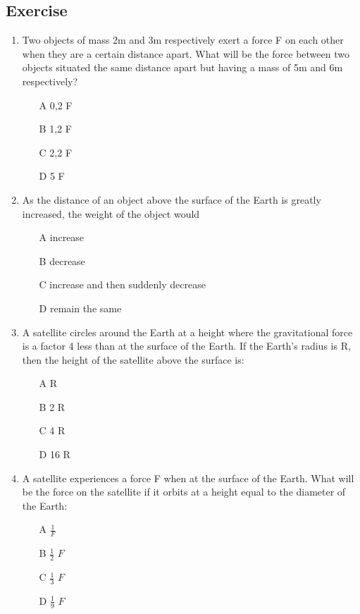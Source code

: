 \subsection{Exercise}
\begin{enumerate}
\item {Two objects of mass 2m and 3m respectively exert a force F on each other 
when they are a certain distance apart. What will be the force between two objects situated the same distance apart but having a mass of 5m and 6m respectively?
\begin{enumerate}
\item [A] 0,2 F		
\item [B] 1,2 F		
\item [C] 2,2 F		
\item [D] 5 F
\end{enumerate}
}

\item {As the distance of an object above the surface of the Earth is greatly increased, the 
weight of the object would
\begin{enumerate}
\item [A] increase
\item [B] decrease 
\item [C] increase and then suddenly decrease
\item [D] remain the same
\end{enumerate}
}

\item {A satellite circles around the Earth at a height where the gravitational force is a 
factor 4 less than at the surface of the Earth. If the Earth's radius is R, then the height of the satellite above the surface is: 
\begin{enumerate}
\item [A] R
\item [B] 2 R
\item [C] 4 R
\item [D] 16 R
\end{enumerate}
}

\item {A satellite experiences a force F when at the surface of the Earth. What will be the force on the satellite if it orbits at a height equal to the diameter of the Earth:
\begin{enumerate}
\item [A] $\frac{1}{F}$
\item [B] $\frac{1}{2}$ $F$	
\item [C] $\frac{1}{3}$ $F$
\item [D] $\frac{1}{9}$ $F$
\end{enumerate}}


\end{enumerate}

